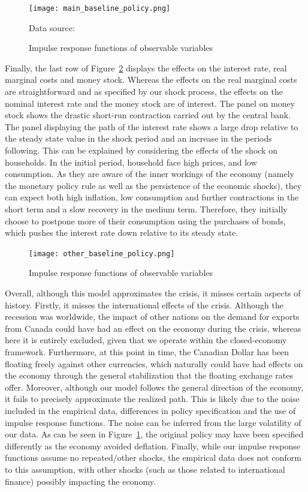 \documentclass[12pt]{article}
\begin{document}
\begin{figure}[!h]
    \caption{Impulse response functions of observable variables}\label{fig:main_baseline}
    \centering
    \texttt{[image: main\_baseline\_policy.png]}
    
    \tiny{Data source: \citeauthor{worldbank_inflation_ca}}
\end{figure}

Finally, the last row of Figure~\ref{fig:other_baseline} displays the effects on the interest rate, real marginal costs and money stock. Whereas the effects on the real marginal costs are straightforward and as specified by our shock process, the effects on the nominal interest rate and the money stock are of interest. The panel on money stock shows the drastic short-run contraction carried out by the central bank. The panel displaying the path of the interest rate shows a large drop relative to the steady state value in the shock period and an increase in the periods following. This can be explained by considering the effects of the shock on households. In the initial period, household face high prices, and low consumption. As they are aware of the inner workings of the economy (namely the monetary policy rule as well as the persistence of the economic shocks), they can expect both high inflation, low consumption and further contractions in the short term and a slow recovery in the medium term. Therefore, they initially choose to postpone more of their consumption using the purchases of bonds, which pushes the interest rate down relative to its steady state. 

\begin{figure}[!h]
    \caption{Impulse response functions of observable variables}\label{fig:other_baseline}
    \centering
    \texttt{[image: other\_baseline\_policy.png]}
\end{figure}

Overall, although this model approximates the crisis, it misses certain aspects of history. Firstly, it misses the international effects of the crisis. Although the recession was worldwide, the impact of other nations on the demand for exports from Canada could have had an effect on the economy during the crisis, whereas here it is entirely excluded, given that we operate within the closed-economy framework. Furthermore, at this point in time, the Canadian Dollar has been floating freely against other currencies, which naturally could have had effects on the economy through the general stabilization that the floating exchange rates offer. Moreover, although our model follows the general direction of the economy, it fails to precisely approximate the realized path. This is likely due to the noise included in the empirical data, differences in policy specification and the use of impulse response functions. The noise can be inferred from the large volatility of our data. As can be seen in Figure~\ref{fig:main_baseline}, the original policy may have been specified differently as the economy avoided deflation. Finally, while our impulse response functions assume no repeated/other shocks, the empirical data does not conform to this assumption, with other shocks (such as those related to international finance) possibly impacting the economy.
\end{document}
